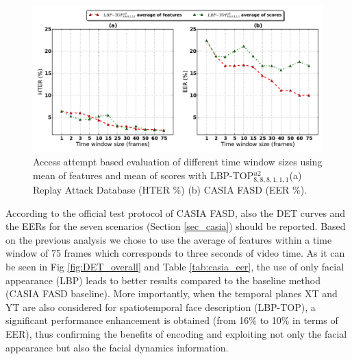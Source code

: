 \begin{figure}[h]
\begin{center}
\includegraphics [width=\textwidth] {images/proposed_countermeasure/video_based_results.pdf}
\caption[Access attempt based evaluation of different time window sizes]{Access attempt based evaluation of different time window sizes using mean of features and mean of scores with LBP-TOP$_{8,8,8,1,1,1}^{u2}$(a) Replay Attack Database (HTER \%) (b) CASIA FASD (EER \%).} \label{fig:blocks_in_videos}
\end{center}
\end{figure}

According to the official test protocol of CASIA FASD, also the DET curves and the EERs for the seven scenarios (Section \ref{sec_casia}) should be reported. Based on the previous analysis we chose to use the average of features within a time window of 75 frames which corresponds to three seconds of video time. As it can be seen in Fig \ref{fig:DET_overall} and Table \ref{tab:casia_eer}, the use of only facial appearance (LBP) leads to better results compared to the baseline method (CASIA FASD baseline). More importantly, when the temporal planes XT and YT are also considered for spatiotemporal face description (LBP-TOP), a significant performance enhancement is obtained (from 16\% to 10\% in terms of EER), thus confirming the benefits of encoding and exploiting not only the facial appearance but also the facial dynamics information.


